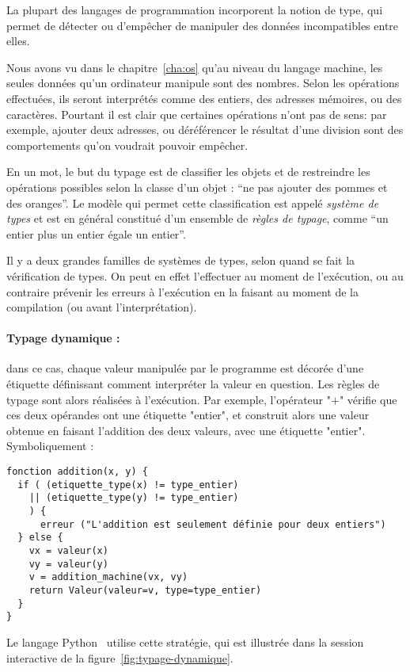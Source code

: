 La plupart des langages de programmation incorporent la notion de type, qui
permet de détecter ou d'empêcher de manipuler des données incompatibles entre
elles.

Nous avons vu dans le chapitre~\ref{cha:os} qu'au niveau du langage machine, les
seules données qu'un ordinateur manipule sont des nombres. Selon les opérations
effectuées, ils seront interprétés comme des entiers, des adresses mémoires, ou
des caractères. Pourtant il est clair que certaines opérations n'ont pas de
sens: par exemple, ajouter deux adresses, ou déréférencer le résultat d'une
division sont des comportements qu'on voudrait pouvoir empêcher.

En un mot, le but du typage est de classifier les objets et de restreindre les
opérations possibles selon la classe d'un objet : ``ne pas ajouter des pommes et
des oranges''. Le modèle qui permet cette classification est appelé
\emph{système de types} et est en général constitué d'un ensemble de
\emph{règles de typage}, comme ``un entier plus un entier égale un entier''.

Il y a deux grandes familles de systèmes de types, selon quand se fait la
vérification de types. On peut en effet l'effectuer au moment de l'exécution, ou
au contraire prévenir les erreurs à l'exécution en la faisant au moment de la
compilation (ou avant l'interprétation).

\paragraph{Typage dynamique :} dans ce cas, chaque valeur manipulée par le
programme est décorée d'une étiquette définissant comment interpréter la valeur
en question. Les règles de typage sont alors réalisées à l'exécution. Par
exemple, l'opérateur "$+$" vérifie que ces deux opérandes ont une étiquette
"entier", et construit alors une valeur obtenue en faisant l'addition des deux
valeurs, avec une étiquette "entier". Symboliquement :

\begin{verbatim}
fonction addition(x, y) {
  if ( (etiquette_type(x) != type_entier)
    || (etiquette_type(y) != type_entier)
    ) {
      erreur ("L'addition est seulement définie pour deux entiers")
  } else {
    vx = valeur(x)
    vy = valeur(y)
    v = addition_machine(vx, vy)
    return Valeur(valeur=v, type=type_entier)
  }
}
\end{verbatim}

Le langage Python~ utilise cette stratégie, qui est illustrée dans
la session interactive de la figure~\ref{fig:typage-dynamique}.

